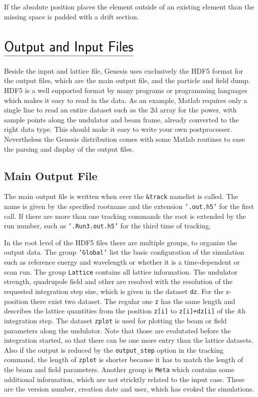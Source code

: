 \documentclass[12pt]{book}
\begin{document}
If the absolute position places the element outside of an existing element than the missing space is padded with a drift section.




\chapter*{\vspace{-3cm}$\underline{\mbox{\rule[-0.5em]{0cm}{1em}\huge\sf Output and Input Files}}$}


Beside the input and lattice file, Genesis uses exclusively the HDF5 format for the output files, which are the main output file, and the particle and field dump. HDF5 is a well supported format by many programs or programming languages which makes it easy to read in the data. As an example, Matlab requires only a single line to read an entire dataset such as the 2d array for the power, with sample points along the undulator and beam frame, already converted to the right data type.  This should make it easy to write your own postprocesser. Nevertheless the Genesis distribution comes with some Matlab routines to ease the parsing and display of the output files.

\section{\sf Main Output File}

The main output file is written when ever the {\tt \&track} namelist is called. The name is given by the specified rootname and the extension {\tt '.out.h5'} for the first call. If there are more than one tracking commands the root is extended by the run number, such as {\tt '.Run3.out.h5'} for the third time of tracking.

In the root level of the HDF5 files there are multiple groups, to organize the output data. The group {\tt 'Global'} list the basic configuration of the simulation such as reference energy and wavelength or whether it is a time-dependent or scan run.
The group {\tt Lattice} contains all lattice information. The undulator strength, quadrupole field and other are resolved with the resolution of the requested integration step size, which is given in the dataset {\tt dz}. For the z-position there exist two dataset. The regular one {\tt z} has the same length and describes the lattice quantities from the position {\tt z[i]} to {\tt z[i]+dz[i]} of the {\it i}th integration step. The dataset {\tt zplot} is used for plotting the beam or field parameters along the undulator. Note that those are evalutated before the integration started, so that  there  can be one more entry than the lattice datasets. Also if the output is reduced by the {\tt output\_step} option in the tracking command, the length of {\tt zplot} is shorter because it has to match the length of the beam and field parameters. Another group is {\tt Meta} which contains some additional information, which are not stricktly related to the input case. These are the version number, creation date and user, which has evoked the simulations.
\end{document}
